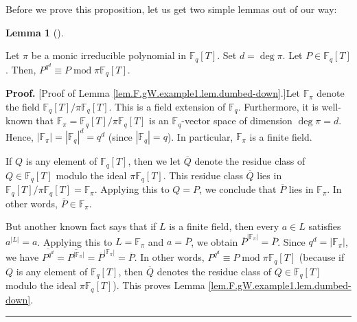 \documentclass[numbers=enddot,12pt,final,onecolumn,notitlepage]{scrartcl}%
\theoremstyle{definition}
\newtheorem{lem}[theo]{Lemma}
\newenvironment{lemma}[1][]
{\begin{lem}[#1]\begin{leftbar}}
{\end{leftbar}\end{lem}}
\newenvironment{proof}[1][Proof]{\noindent\textbf{#1.} }{\ \rule{0.5em}{0.5em}}
\begin{document}
Before we prove this proposition, let us get two simple lemmas out of our way:

\begin{lemma}
\label{lem.F.gW.example1.lem.dumbed-down}Let $\pi$ be a monic irreducible
polynomial in $\mathbb{F}_{q}\left[  T\right]  $. Set $d=\deg\pi$. Let
$P\in\mathbb{F}_{q}\left[  T\right]  $. Then, $P^{q^{d}}\equiv
P\operatorname{mod}\pi\mathbb{F}_{q}\left[  T\right]  $.
\end{lemma}

\begin{proof}
[Proof of Lemma \ref{lem.F.gW.example1.lem.dumbed-down}.]Let $\mathbb{F}_{\pi
}$ denote the field $\mathbb{F}_{q}\left[  T\right]  /\pi\mathbb{F}_{q}\left[
T\right]  $. This is a field extension of $\mathbb{F}_{q}$. Furthermore, it is
well-known that $\mathbb{F}_{\pi}=\mathbb{F}_{q}\left[  T\right]
/\pi\mathbb{F}_{q}\left[  T\right]  $ is an $\mathbb{F}_{q}$-vector space of
dimension $\deg\pi=d$. Hence, $\left\vert \mathbb{F}_{\pi}\right\vert
=\left\vert \mathbb{F}_{q}\right\vert ^{d}=q^{d}$ (since $\left\vert
\mathbb{F}_{q}\right\vert =q$). In particular, $\mathbb{F}_{\pi}$ is a finite field.

If $Q$ is any element of $\mathbb{F}_{q}\left[  T\right]  $, then we let
$\overline{Q}$ denote the residue class of $Q\in\mathbb{F}_{q}\left[
T\right]  $ modulo the ideal $\pi\mathbb{F}_{q}\left[  T\right]  $. This
residue class $\overline{Q}$ lies in $\mathbb{F}_{q}\left[  T\right]
/\pi\mathbb{F}_{q}\left[  T\right]  =\mathbb{F}_{\pi}$. Applying this to
$Q=P$, we conclude that $\overline{P}$ lies in $\mathbb{F}_{\pi}$. In other
words, $\overline{P}\in\mathbb{F}_{\pi}$.

But another known fact says that if $L$ is a finite field, then every $a\in L$
satisfies $a^{\left\vert L\right\vert }=a$. Applying this to $L=\mathbb{F}%
_{\pi}$ and $a=\overline{P}$, we obtain $\overline{P}^{\left\vert
\mathbb{F}_{\pi}\right\vert }=\overline{P}$. Since $q^{d}=\left\vert
\mathbb{F}_{\pi}\right\vert $, we have $\overline{P^{q^{d}}}=\overline
{P^{\left\vert \mathbb{F}_{\pi}\right\vert }}=\overline{P}^{\left\vert
\mathbb{F}_{\pi}\right\vert }=\overline{P}$. In other words, $P^{q^{d}}\equiv
P\operatorname{mod}\pi\mathbb{F}_{q}\left[  T\right]  $ (because if $Q$ is any
element of $\mathbb{F}_{q}\left[  T\right]  $, then $\overline{Q}$ denotes the
residue class of $Q\in\mathbb{F}_{q}\left[  T\right]  $ modulo the ideal
$\pi\mathbb{F}_{q}\left[  T\right]  $). This proves Lemma
\ref{lem.F.gW.example1.lem.dumbed-down}.
\end{proof}
\end{document}
